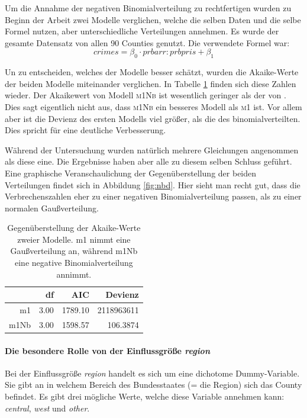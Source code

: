 Um die Annahme der negativen Binomialverteilung zu rechtfertigen wurden zu Beginn der Arbeit zwei Modelle verglichen, welche die selben Daten und die selbe Formel nutzen, aber unterschiedliche Verteilungen annehmen.
Es wurde der gesamte Datensatz von allen 90 Counties genutzt.
Die verwendete Formel war:
\begin{equation}
crimes = \beta_0 \cdot prbarr:prbpris + \beta_1
\end{equation}

Un zu entscheiden, welches der Modelle besser sch\"atzt, wurden die Akaike-Werte der beiden Modelle miteinander verglichen.
In Tabelle \ref{tab:agn} finden sich diese Zahlen wieder.
Der Akaikewert von Modell \textsc{m1Nb} ist wesentlich geringer als der von .
Dies sagt eigentlich nicht aus, dass \textsc{m1Nb} ein besseres Modell als \textsc{m1} ist.
Vor allem aber ist die Devienz des ersten Modells viel gr\"o\ss{}er, als die des binomialverteilten.
Dies spricht f\"ur eine deutliche Verbesserung.
\par\smallskip
W\"ahrend der Untersuchung wurden nat\"urlich mehrere Gleichungen angenommen als diese eine.
Die Ergebnisse haben aber alle zu diesem selben Schluss gef\"uhrt.
Eine graphische Veranschaulichung der Gegen\"uberstellung der beiden Verteilungen findet sich in Abbildung \ref{fig:nbd}.
Hier sieht man recht gut, dass die Verbrechenszahlen eher zu einer negativen Binomialverteilung passen, als zu einer normalen Gau\ss{}verteilung.
  
\begin{table}[ht]
\centering
\begin{tabular}{rrrr}
  \hline
 	   & df & AIC & Devienz\\ 
  \hline
	m1 & 3.00 & 1789.10 & 2118963611\\ 
  m1Nb & 3.00 & 1598.57 & 106.3874\\ 
   \hline
\end{tabular}
\caption{Gegen\"uberstellung der Akaike-Werte zweier Modelle. m1 nimmt eine Gau\ss{}verteilung an, w\"ahrend m1Nb eine negative Binomialverteilung annimmt.}
\label{tab:agn}
\end{table}


\label{sec:preg}
\paragraph{Die besondere Rolle von der Einflussgr\"o\ss{}e \textit{region}}
Bei der Einflussgr\"o\ss{}e \textit{region} handelt es sich um eine dichotome Dummy-Variable.
Sie gibt an in welchem Bereich des Bundesstaates (= die Region) sich das County befindet.
Es gibt drei m\"ogliche Werte, welche diese Variable annehmen kann: \textit{central}, \textit{west} und \textit{other}.

